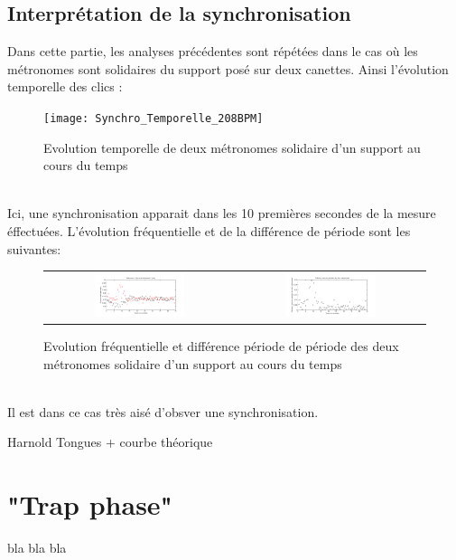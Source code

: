 \documentclass[a4paper,11pt]{report}
\begin{document}
\subsection{Interprétation de la synchronisation}
Dans cette partie, les analyses précédentes sont répétées dans le cas où les métronomes sont solidaires du support posé sur deux canettes. Ainsi l'évolution temporelle des clics :
\begin{figure}[h]
\centering
\texttt{[image: Synchro\_Temporelle\_208BPM]}
\caption{Evolution temporelle de deux métronomes solidaire d'un support au cours du temps}\label{SynchronisationT}
\end{figure}\\
Ici, une synchronisation apparait dans les 10 premières secondes de la mesure éffectuées.
L'évolution fréquentielle et de la différence de période sont les suivantes:
\begin{figure}[h]
\centering
\begin{tabular}{cc}
\includegraphics[width=0.5\textwidth]{Synchro_Frequence_208BPM} & \includegraphics[width=0.5\textwidth]{Synchro_Periode_208BPM}\\
\end{tabular}
\caption{Evolution fréquentielle et différence période de période des deux métronomes solidaire d'un support au cours du temps}\label{Synchronisation}
\end{figure}\\
Il est dans ce cas très aisé d'obsver une synchronisation.

Harnold Tongues + courbe théorique

\section{"Trap phase"}

bla bla bla
\end{document}
